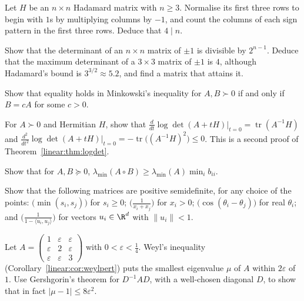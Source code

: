 \begin{exercise}[$\star\star$]\label{linear:ex:hadamard4}
Let $H$ be an $n\times n$ Hadamard matrix with $n\ge3$. Normalise its first three rows to begin with $1$s by multiplying columns by
$-1$, and count the columns of each sign pattern in the first three rows. Deduce that $4\mid n$.
\end{exercise}

\begin{exercise}[$\star\star$]\label{linear:ex:maxdet3}
Show that the determinant of an $n\times n$ matrix of $\pm1$ is divisible by $2^{n-1}$. Deduce that the maximum determinant of a $3\times3$
matrix of $\pm1$ is $4$, although Hadamard's bound is $3^{3/2}\approx5.2$, and find a matrix that attains it.
\end{exercise}

\begin{exercise}[$\star$]\label{linear:ex:minkowskieq}
Show that equality holds in Minkowski's inequality for $A,B\succ0$ if and only if $B=cA$ for some $c>0$.
\end{exercise}

\begin{exercise}[$\star\star$]\label{linear:ex:logdetderiv}
For $A\succ0$ and Hermitian $H$, show that $\frac d{dt}\log\det(A+tH)\big|_{t=0}=\operatorname{tr}(A^{-1}H)$ and
$\frac{d^2}{dt^2}\log\det(A+tH)\big|_{t=0}=-\operatorname{tr}\bigl((A^{-1}H)^2\bigr)\le0$. This is a second proof of Theorem~\ref{linear:thm:logdet}.
\end{exercise}

\begin{exercise}[$\star\star$]\label{linear:ex:schurmin}
Show that for $A,B\succeq0$, $\lambda_{\min}(A\circ B)\ge\lambda_{\min}(A)\min_ib_{ii}$.
\end{exercise}

\begin{exercise}[$\star\star$]\label{linear:ex:kernels}
Show that the following matrices are positive semidefinite, for any choice of the points: $\bigl(\min(s_i,s_j)\bigr)$ for $s_i\ge0$;
$\bigl(\frac1{x_i+x_j}\bigr)$ for $x_i>0$; $\bigl(\cos(\theta_i-\theta_j)\bigr)$ for real $\theta_i$; and $\bigl(\frac1{1-\langle u_i,u_j\rangle}\bigr)$
for vectors $u_i\in\R^d$ with $\|u_i\|<1$.
\end{exercise}

\begin{exercise}[$\star$]\label{linear:ex:gershscale}
Let $A=\begin{pmatrix}1&\varepsilon&\varepsilon\\\varepsilon&2&\varepsilon\\\varepsilon&\varepsilon&3\end{pmatrix}$ with $0<\varepsilon<\frac14$. Weyl's
inequality (Corollary~\ref{linear:cor:weylpert}) puts the smallest eigenvalue $\mu$ of $A$ within $2\varepsilon$ of $1$. Use Gershgorin's theorem
for $D^{-1}AD$, with a well-chosen diagonal $D$, to show that in fact $|\mu-1|\le8\varepsilon^2$.
\end{exercise}

